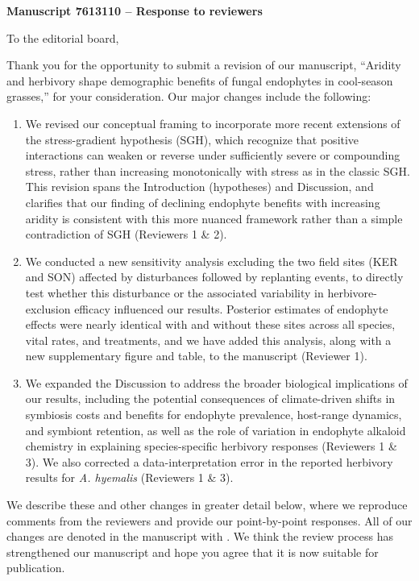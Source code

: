 \documentclass[12pt]{article}
\newcommand{\revise}[1]{{\color{Mahogany}{#1}}}
\begin{document}
\vspace*{-2em}
\begin{center}
{\LARGE\bfseries Manuscript 7613110 -- Response to reviewers}
\end{center}
\vspace{1em}
\noindent To the editorial board,

Thank you for the opportunity to submit a revision of our manuscript, ``Aridity and herbivory shape demographic benefits of fungal endophytes in cool-season grasses,'' for your consideration. Our major changes include the following:
\begin{enumerate}
	\item {We revised our conceptual framing to incorporate more recent extensions of the stress-gradient hypothesis (SGH), which recognize that positive interactions can weaken or reverse under sufficiently severe or compounding stress, rather than increasing monotonically with stress as in the classic SGH. This revision spans the Introduction (hypotheses) and Discussion, and clarifies that our finding of declining endophyte benefits with increasing aridity is consistent with this more nuanced framework rather than a simple contradiction of SGH (Reviewers 1 \& 2).}
	\item {We conducted a new sensitivity analysis excluding the two field sites (KER and SON) affected by disturbances followed by replanting events, to directly test whether this disturbance or the associated variability in herbivore-exclusion efficacy influenced our results. Posterior estimates of endophyte effects were nearly identical with and without these sites across all species, vital rates, and treatments, and we have added this analysis, along with a new supplementary figure and table, to the manuscript (Reviewer 1).}
	\item {We expanded the Discussion to address the broader biological implications of our results, including the potential consequences of climate-driven shifts in symbiosis costs and benefits for endophyte prevalence, host-range dynamics, and symbiont retention, as well as the role of variation in endophyte alkaloid chemistry in explaining species-specific herbivory responses (Reviewers 1 \& 3). We also corrected a data-interpretation error in the reported herbivory results for \textit{A. hyemalis} (Reviewers 1 \& 3).}
\end{enumerate}

We describe these and other changes in greater detail below, where we reproduce comments from the reviewers and provide our point-by-point responses.
All of our changes are denoted in the manuscript with \revise{Mahogany font}.
We think the review process has strengthened our manuscript and hope you agree that it is now suitable for publication.
\end{document}
